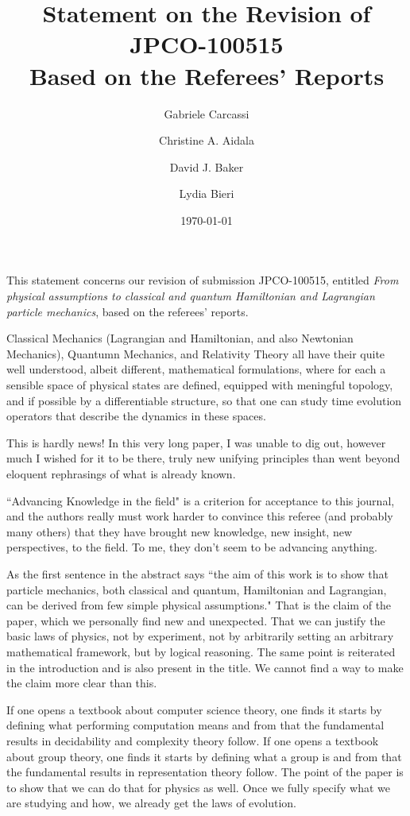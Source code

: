 \documentclass[10pt]{article}
\title{Statement on the Revision of JPCO-100515 \\
  Based on the Referees' Reports}
\author{Gabriele Carcassi \and Christine A. Aidala \and David J. Baker \and Lydia Bieri}
\date{\today}
\begin{document}
This statement concerns our revision of submission JPCO-100515,
entitled \textit{From physical assumptions to classical and quantum Hamiltonian and Lagrangian particle mechanics}, based on the referees'
reports.



\begin{response}{Classical Mechanics (Lagrangian and Hamiltonian, and also Newtonian Mechanics), Quantumn Mechanics, and Relativity Theory all have their quite well understood, albeit different, mathematical formulations, where for each a sensible space of physical states are defined, equipped with meningful topology, and if possible by a differentiable structure, so that one can study time evolution operators that describe the dynamics in these spaces. 
		
		This is hardly news! In this very long paper, I was unable to dig out,  however much I wished for it to be there, truly new unifying principles than went beyond eloquent rephrasings of what is already known.  
		
		``Advancing Knowledge in the field" is a criterion for acceptance to this journal, and the authors really must work harder to convince this referee (and probably many others) that they have brought new knowledge, new insight, new perspectives, to the field. To me, they don't seem to be advancing anything.  }
	
As the first sentence in the abstract says ``the aim of this work is to show that particle mechanics, both classical and quantum, Hamiltonian and Lagrangian, can be derived from few simple physical assumptions." That is the claim of the paper, which we personally find new and unexpected. That we can justify the basic laws of physics, not by experiment, not by arbitrarily setting an arbitrary mathematical framework, but by logical reasoning. The same point is reiterated in the introduction and is also present in the title. We cannot find a way to make the claim more clear than this.

If one opens a textbook about computer science theory, one finds it starts by defining what performing computation means and from that the fundamental results in decidability and complexity theory follow. If one opens a textbook about group theory, one finds it starts by defining what a group is and from that the fundamental results in representation theory follow. The point of the paper is to show that we can do that for physics as well. Once we fully specify what we are studying and how, we already get the laws of evolution.


\end{response}
\end{document}
